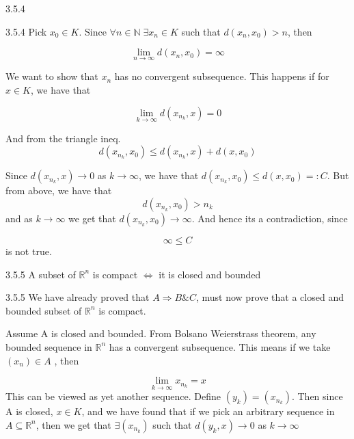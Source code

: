 \documentclass[a4paper,norsk]{article}
\renewcommand{\leq}{\leqslant}
\begin{document}
\begin{propositionbox}{3.5.4}{}
\begin{proofbox}{3.5.4}{}
  Pick $ x_0 \in K $. Since $ \forall n \in \mathbb{N} \; \exists x_n \in  K $ such that $ d \left( x_n, x_0 \right) > n $, then

  \[
      \lim_{n \to \infty}  d \left( x_n, x_0 \right) = \infty
  \]

  We want to show that $ x_n $ has no convergent subsequence. This happens if for $ x \in K $, we have that 

  \[
      \lim_{k \to \infty} d \left( x_{n_k}, x \right) = 0 
  \]

  And from the triangle ineq.
  \[
      d \left( x_{n_k}, x_0 \right) \leq d \left( x_{n_k}, x \right) + d \left( x, x_0 \right) 
  \]
  
  Since $ d \left( x_{n_k}, x \right) \to 0 $ as $ k \to \infty $, we have that $ d \left( x_{n_k}, x_0 \right) \leq d \left( x, x_0 \right) =: C $. But from above, we have that 
  \[
      d \left( x_{n_k}, x_0 \right) > n_k
  \]
  and as $ k \to \infty $ we get that $ d \left( x_{n_k}, x_0 \right) \to \infty $. And hence its a contradiction, since

  \[
      \infty \leq C 
  \]
  is not true.
  
  
  
  
  
  
\end{proofbox}
\end{propositionbox}

\begin{corollarybox}{3.5.5}{}
A subset of $ \mathbb{R}^n $ is compact $ \iff  $ it is closed and bounded

\begin{proofbox}{3.5.5}{}
  We have already proved that $ A \Rightarrow B \& C $, must now prove that a closed and bounded subset of $ \mathbb{R}^n $  is compact. 

  Assume A is closed and bounded. From Bolsano Weierstrass theorem, any bounded sequence in $ \mathbb{R}^n $ has a convergent subsequence. This means if we take $ \left( x_n \right) \in A $ , then

  \[
      \lim_{k \to \infty} x_{n_k} = x
  \]
  This can be viewed as yet another sequence. Define $ \left( y_k \right) = \left( x_{n_k} \right)  $. Then since A is closed, $ x \in K $, and we have found that if we pick an arbitrary sequence in $ A \subseteq \mathbb{R}^n $, then we get that $ \exists \left( x_{n_k} \right)  $ such that $ d \left( y_k, x \right) \to 0 $ as $ k \to \infty $ 
  
\end{proofbox}
\end{corollarybox}
\end{document}
